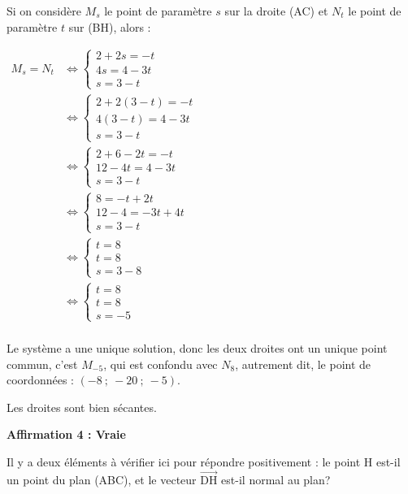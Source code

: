 \documentclass[10pt]{article}
\providecommand{\vect}[1]{\overrightarrow{#1}}
\begin{document}
Si on considère $M_s$ le point de paramètre $s$ sur la droite (AC) et $N_t$ le point de paramètre $t$ sur (BH), alors :

$\begin{aligned} M_s = N_t &\iff \begin{cases} 2+2s =  - t\\4s = 4 - 3t\\s=3 - t\end{cases}\\
&\iff \begin{cases} 2+2(3-t) =  - t\\4(3-t) = 4 - 3t\\s=3 - t\end{cases}\\
&\iff \begin{cases} 2+6-2t =  - t\\12-4t = 4 - 3t\\s=3 - t\end{cases}\\
&\iff \begin{cases} 8 =  -t+2t\\12-4 =  - 3t+4t\\s=3 - t\end{cases}\\
&\iff \begin{cases} t=8\\t=8\\s=3 - 8\end{cases}\\
&\iff \begin{cases} t=8\\t=8\\s=-5\end{cases}\\
\end{aligned}$

Le système a une unique solution, donc les deux droites ont un unique point commun, c'est $M_{-5}$, qui est confondu avec $N_8$, autrement dit, le point de coordonnées : $(-8~;~ -20~;~-5)$.

Les droites sont bien sécantes.
\medskip





\textbf{Affirmation 4 : Vraie}

Il y a deux éléments à vérifier ici pour répondre positivement : le point H est-il un point du plan (ABC), et le vecteur $\vect{\mathrm{DH}}$ est-il normal au plan?
\end{document}
